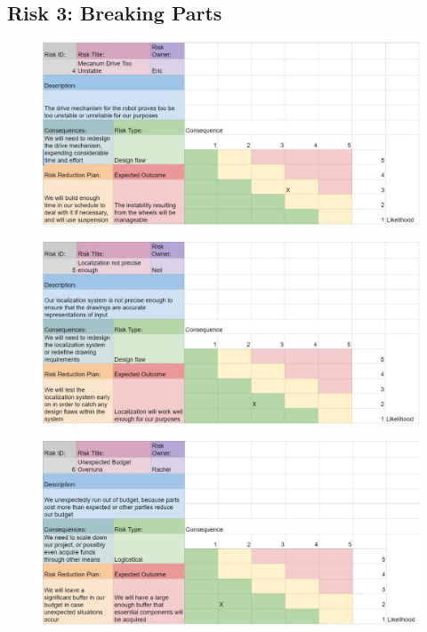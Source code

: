 \subsection{Risk 3: Breaking Parts}
\begin{figure}[h!]
\centering
\includegraphics[width=0.98\columnwidth]{risks/risk4.JPG}
\label{fig:risk4}
\end{figure}
\begin{figure}[h!]
\centering
\includegraphics[width=0.98\columnwidth]{risks/risk5.JPG}
\label{fig:risk5}
\end{figure}
\begin{figure}[h!]
\centering
\includegraphics[width=0.98\columnwidth]{risks/risk6.JPG}
\label{fig:risk6}
\end{figure}

\clearpage
